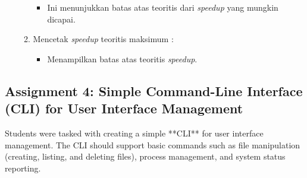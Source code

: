 \documentclass[12pt]{article}
\begin{document}
\begin{enumerate}
\begin{enumerate}
\begin{itemize}
                \item Ini menunjukkan batas atas teoritis dari \textit{speedup} yang mungkin dicapai.
            \end{itemize}
            
        \item Mencetak \textit{speedup} teoritis maksimum :
            \begin{itemize}
                \item Menampilkan batas atas teoritis \textit{speedup}.
            \end{itemize}
            
    \end{enumerate}
\end{enumerate}

\subsection{Assignment 4: Simple Command-Line Interface (CLI) for User Interface Management}
Students were tasked with creating a simple **CLI** for user interface management. The CLI should support basic commands such as file manipulation (creating, listing, and deleting files), process management, and system status reporting.
\end{document}
